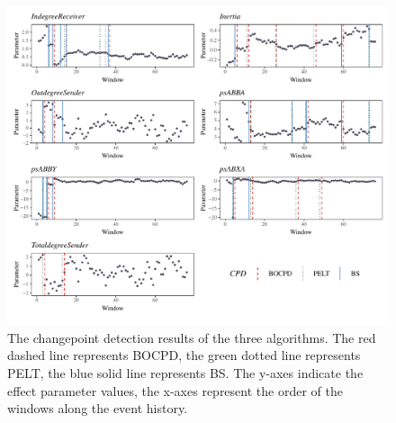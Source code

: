 \documentclass[]{interact}
\theoremstyle{plain}%
\theoremstyle{definition}
\theoremstyle{remark}
\begin{document}
	\begin{figure}[H]
		\captionsetup{justification=raggedright}
		\renewcommand{\figurename}{Figure}
		\centering
		\includegraphics[width=\textwidth,height=\textheight,keepaspectratio]{Apollo_CPD_bw}
		\caption{\fontsize{8}{10}\selectfont The changepoint detection results of the three algorithms. The red dashed line represents BOCPD, the green dotted line represents PELT, the blue solid line represents BS. The y-axes indicate the effect parameter values, the x-axes represent the order of the windows along the event history.}
		\label{Apollo_effects_cp_plot}
	\end{figure}
\end{document}

